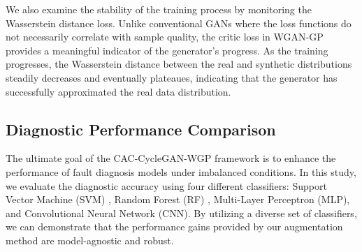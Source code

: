 \documentclass[twocolumn]{IEEEtran}
\begin{document}
We also examine the stability of the training process by monitoring the Wasserstein distance loss. Unlike conventional GANs where the loss functions do not necessarily correlate with sample quality, the critic loss in WGAN-GP provides a meaningful indicator of the generator's progress. As the training progresses, the Wasserstein distance between the real and synthetic distributions steadily decreases and eventually plateaues, indicating that the generator has successfully approximated the real data distribution.

\subsection{Diagnostic Performance Comparison}
The ultimate goal of the CAC-CycleGAN-WGP framework is to enhance the performance of fault diagnosis models under imbalanced conditions. In this study, we evaluate the diagnostic accuracy using four different classifiers: Support Vector Machine (SVM) \cite{Cortes1995}, Random Forest (RF) \cite{Breiman2001}, Multi-Layer Perceptron (MLP), and Convolutional Neural Network (CNN). By utilizing a diverse set of classifiers, we can demonstrate that the performance gains provided by our augmentation method are model-agnostic and robust.
\end{document}
